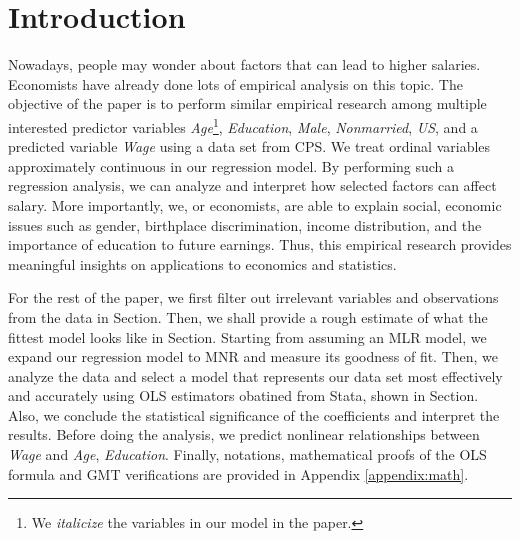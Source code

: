 \section{Introduction}
\label{sec:intro}

Nowadays, people may wonder about factors that can lead to higher salaries. Economists have already done lots of empirical analysis on this topic. The objective of the paper is to perform similar empirical research among multiple interested predictor variables \textit{Age}\footnote{We \textit{italicize} the variables in our model in the paper.}, \textit{Education}, \textit{Male}, \textit{Nonmarried}, \textit{US}, and a predicted variable \textit{Wage} using a data set from \acs{CPS}. We treat ordinal variables approximately continuous in our regression model. By performing such a regression analysis, we can analyze and interpret how selected factors can affect salary. More importantly, we, or economists, are able to explain social, economic issues such as gender, birthplace discrimination, income distribution, and the importance of education to future earnings. Thus, this empirical research provides meaningful insights on applications to economics and statistics.

For the rest of the paper, we first filter out irrelevant variables and observations from the data in \hyperref[sec:data]{} Section. Then, we shall provide a rough estimate of what the fittest model looks like in \hyperref[sec:em]{} Section.  Starting from assuming an \acs{MLR} model, we expand our regression model to \acs{MNR} and measure its goodness of fit. Then, we analyze the data and select a model that represents our data set most effectively and accurately using \acs{OLS} estimators obatined from Stata, shown in \hyperref[sec:results]{} Section. Also, we conclude the statistical significance of the coefficients and interpret the results. Before doing the analysis, we predict nonlinear relationships between \textit{Wage} and \textit{Age}, \textit{Education}. Finally, notations, mathematical proofs of the \acs{OLS} formula and \acs{GMT} verifications are provided in Appendix \ref{appendix:math}.